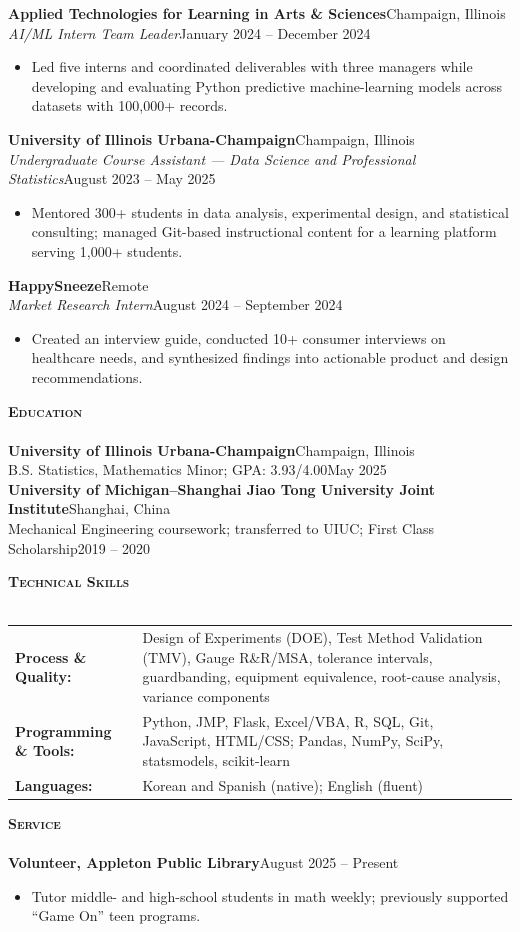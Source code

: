 \documentclass[a4paper]{article}
\newcommand{\lineunder}{
    \vspace*{-8pt} \\
    \hspace*{-18pt} \hrulefill \\
}
\newcommand{\header}[1]{
    \Needspace{4\baselineskip}
    {\hspace*{-18pt}\vspace*{6pt} \textsc{#1}}
    \vspace*{-6pt} \lineunder
}
\newcommand{\role}[4]{
    \Needspace{8\baselineskip}
    \vspace{2pt}
    \textbf{#1}\hfill #2\\
    \textit{#3}\hfill #4\\[-3pt]
}
\begin{document}
\role{Applied Technologies for Learning in Arts \& Sciences}{Champaign, Illinois}
{AI/ML Intern Team Leader}{January 2024 -- December 2024}
\begin{itemize}[noitemsep]
  \item Led five interns and coordinated deliverables with three managers while developing and evaluating Python predictive machine-learning models across datasets with 100,000+ records.
\end{itemize}

\role{University of Illinois Urbana-Champaign}{Champaign, Illinois}
{Undergraduate Course Assistant --- Data Science and Professional Statistics}{August 2023 -- May 2025}
\begin{itemize}[noitemsep]
  \item Mentored 300+ students in data analysis, experimental design, and statistical consulting; managed Git-based instructional content for a learning platform serving 1,000+ students.
\end{itemize}

\role{HappySneeze}{Remote}
{Market Research Intern}{August 2024 -- September 2024}
\begin{itemize}[noitemsep]
  \item Created an interview guide, conducted 10+ consumer interviews on healthcare needs, and synthesized findings into actionable product and design recommendations.
\end{itemize}

\vspace*{1mm}
\header{\textbf{Education}}
\textbf{University of Illinois Urbana-Champaign}\hfill Champaign, Illinois\\
B.S. Statistics, Mathematics Minor; GPA: 3.93/4.00\hfill May 2025\\[-1pt]
\textbf{University of Michigan--Shanghai Jiao Tong University Joint Institute}\hfill Shanghai, China\\
Mechanical Engineering coursework; transferred to UIUC; First Class Scholarship\hfill 2019 -- 2020\\[-1pt]

\vspace*{1mm}
\header{\textbf{Technical Skills}}
\begin{tabular}{@{}l >{\raggedright\arraybackslash}p{}@{}}
\textbf{Process \& Quality:} & Design of Experiments (DOE), Test Method Validation (TMV), Gauge R\&R/MSA, tolerance intervals, guardbanding, equipment equivalence, root-cause analysis, variance components\\
\textbf{Programming \& Tools:} & Python, JMP, Flask, Excel/VBA, R, SQL, Git, JavaScript, HTML/CSS; Pandas, NumPy, SciPy, statsmodels, scikit-learn\\
\textbf{Languages:} & Korean and Spanish (native); English (fluent)
\end{tabular}

\vspace*{1mm}
\header{\textbf{Service}}
\textbf{Volunteer, Appleton Public Library}\hfill August 2025 -- Present
\begin{itemize}[noitemsep]
  \item Tutor middle- and high-school students in math weekly; previously supported ``Game On'' teen programs.
\end{itemize}
\end{document}
